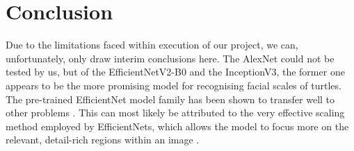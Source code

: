 \section{Conclusion}

Due to the limitations faced within execution of our project, we can, unfortunately, only draw interim conclusions here. The AlexNet could not be tested by us, but of the EfficientNetV2-B0 and the InceptionV3, the former one appears to be the more promising model for recognising facial scales of turtles. The pre-trained EfficientNet model family has been shown to transfer well to other problems \citep{Tan2019}. This can most likely be attributed to the very effective scaling method employed by EfficientNets, which allows the model to focus more on the relevant, detail-rich regions within an image \citep{Tan2019}.